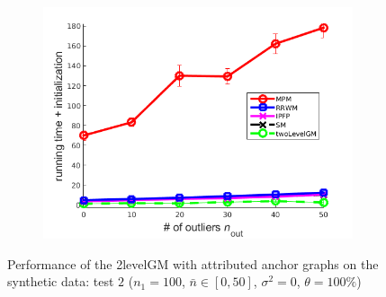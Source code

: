\begin{figure}[h]
\begin{subfigure}[b]{0.3\textwidth}
		\includegraphics[scale=0.25]{"chapter3/fig/SyntheticTest/descr/Results_v4.3.3/Test3/time_summary_avg10t"} 
	\end{subfigure} 	
	\caption[Performance of the 2levelGM with attributed anchor graphs on the synthetic data (test $2$)]{Performance of the 2levelGM with attributed anchor graphs on the synthetic data: test $2$ ($n_1=100$, $\bar{n}\in[0,50]$, $\sigma^2=0$, $\theta=100\%$)}
	\label{fig:synTest2_descr_ver433}
\end{figure}
\vspace{-10pt}
